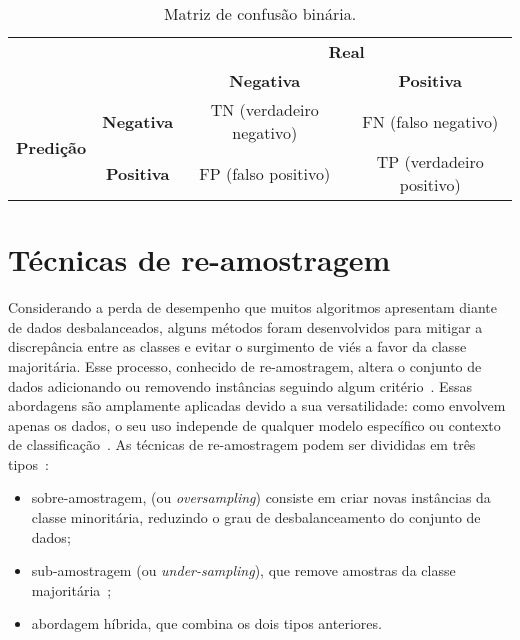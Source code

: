 \begin{table}[htbp]
  \centering
  \begin{tabular}{cc|cc|}
    \cline{3-4}
    \multicolumn{2}{c|}{\multirow{2}{*}{}}                   & \multicolumn{2}{c|}{\textbf{Real}}                                                                                \\ \cline{3-4}
    \multicolumn{2}{c|}{}                                    & \multicolumn{1}{c|}{\textbf{Negativa}} & \textbf{Positiva}                                                        \\ \hline
    \multicolumn{1}{|c|}{\multirow{2}{*}{\textbf{Predição}}} & \textbf{Negativa}                      & \multicolumn{1}{c|}{TN (verdadeiro negativo)} & FN (falso negativo)      \\ \cline{2-4}
    \multicolumn{1}{|c|}{}                                   & \textbf{Positiva}                      & \multicolumn{1}{c|}{FP (falso positivo)}      & TP (verdadeiro positivo) \\ \hline
  \end{tabular}
  \caption{Matriz de confusão binária.}
  \label{tab:matriz-confusao}
\end{table}

\section{Técnicas de re-amostragem}

Considerando a perda de desempenho que muitos algoritmos apresentam diante de dados desbalanceados, alguns métodos foram desenvolvidos para mitigar a discrepância entre as classes e evitar o surgimento de viés a favor da classe majoritária. Esse processo, conhecido de re-amostragem, altera o conjunto de dados adicionando ou removendo instâncias seguindo algum critério~\cite{Chakravarthy2019}. Essas abordagens são amplamente aplicadas devido a sua versatilidade: como envolvem apenas os dados, o seu uso independe de qualquer modelo específico ou contexto de classificação~\cite{Carvalho2025}. As técnicas de re-amostragem podem ser divididas em três tipos~\cite{Haixiang2017}:

\begin{itemize}
  \item sobre-amostragem, (ou \textit{oversampling}) consiste em criar novas instâncias da classe minoritária, reduzindo o grau de desbalanceamento do conjunto de dados;
  \item sub-amostragem (ou \textit{under-sampling}), que remove amostras da classe majoritária~\cite{Mohammed2020};
  \item abordagem híbrida, que combina os dois tipos anteriores.
\end{itemize}

